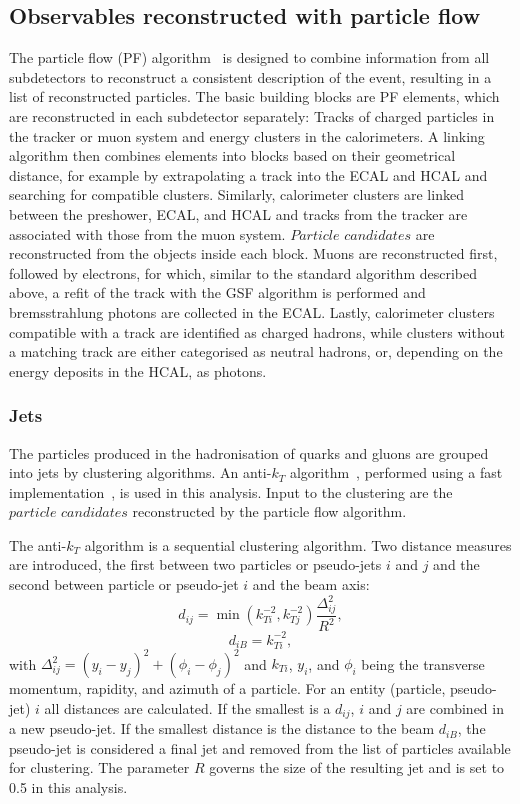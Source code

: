 \subsection{Observables reconstructed with particle flow}
\label{sec:PF}
The particle flow (PF) algorithm~\cite{CMS-PAS-PFT-09-001} is designed to combine information from all subdetectors to reconstruct a consistent description of the event, resulting in a list of reconstructed particles. The basic building blocks are PF elements, which are reconstructed in each subdetector separately: Tracks of charged particles in the tracker or muon system and energy clusters in the calorimeters. A linking algorithm then combines elements into blocks based on their geometrical distance, for example by extrapolating a track into the ECAL and HCAL and searching for compatible clusters. Similarly, calorimeter clusters are linked between the preshower, ECAL, and HCAL and tracks from the tracker are associated with those from the muon system. $\textit{Particle candidates}$ are reconstructed from the objects inside each block. Muons are reconstructed first, followed by electrons, for which, similar to the standard algorithm described above, a refit of the track with the GSF algorithm is performed and bremsstrahlung photons are collected in the ECAL. Lastly, calorimeter clusters compatible with a track are identified as charged hadrons, while clusters without a matching track are either categorised as neutral hadrons, or, depending on the energy deposits in the HCAL, as photons. 
\subsubsection{Jets}
The particles produced in the hadronisation of quarks and gluons are grouped into jets by clustering algorithms. An anti-$k_T$ algorithm~\cite{Cacciari:2008gp}, performed using a fast implementation~\cite{Cacciari:2011ma,Cacciari:2005hq}, is used in this analysis.  Input to the clustering are the $\textit{particle candidates}$ reconstructed by the particle flow algorithm.

The anti-$k_T$ algorithm is a sequential clustering algorithm. Two distance measures are introduced, the first between two particles or pseudo-jets $i$ and $j$ and the second between particle or pseudo-jet $i$ and the beam axis: 
\begin{equation}
d_{ij} = \min(k_{Ti}^{-2},k_{Tj}^{-2})\frac{\Delta^2_{ij}}{R^2},
\end{equation}
\begin{equation}
d_{iB} = k_{Ti}^{-2},
\end{equation}
with $\Delta_{ij}^2 = (y_i-y_j)^2 + (\phi_i - \phi_j)^2$ and $k_{Ti}$, $y_i$, and $\phi_i$ being the transverse momentum, rapidity, and azimuth of a particle. For an entity (particle, pseudo-jet) $i$ all distances are calculated. If the smallest is a $d_{ij}$, $i$ and $j$ are combined in a new pseudo-jet. If the smallest distance is the distance to the beam $d_{iB}$, the pseudo-jet is considered a final jet and removed from the list of particles available for clustering. The parameter $R$ governs the size of the resulting jet and is set to 0.5 in this analysis. 

